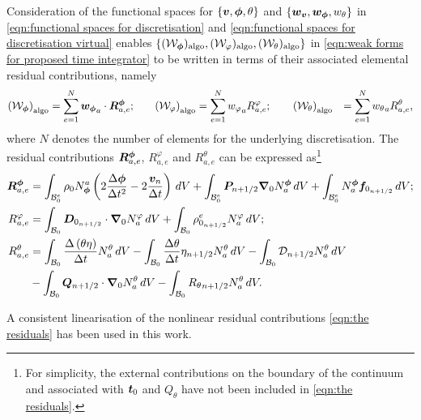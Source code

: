 Consideration of the functional spaces for $\{\boldsymbol{v},\boldsymbol{\phi},\theta\}$ and $\{\boldsymbol{w}_{\boldsymbol{v}},\boldsymbol{w}_{\boldsymbol{\phi}},w_{\theta}\}$ in \eqref{eqn:functional spaces for discretisation} and \eqref{eqn:functional spaces for discretisation virtual} enables  $\{(\mathcal{W}_{\boldsymbol{\phi}})_{\text{algo}},(\mathcal{W}_{{\varphi}})_{\text{algo}},(\mathcal{W}_{\theta})_{\text{algo}}\}$  in \eqref{eqn:weak forms for proposed time integrator} to be written in terms of their associated elemental residual contributions, namely
%
\begin{equation}
  \begin{aligned}	
    \left(\mathcal{W}_{\boldsymbol{\phi}}\right)_{\text{algo}} &= \sum_{e=1}^N{\boldsymbol{w}_{\boldsymbol{\phi}}}_a\cdot\boldsymbol{R}_{a,e}^{\boldsymbol{\phi}};&\quad
    \left(\mathcal{W}_{\varphi}\right)_{\text{algo}} &= \sum_{e=1}^N{w_{\varphi}}_a{R}_{a,e}^{\varphi};\qquad
    \left(\mathcal{W}_{\theta}\right)_{\text{algo}}& = \sum_{e=1}^N{w_{\theta}}_a{R}_{a,e}^{\theta},
  \end{aligned}
\end{equation}
%
where $N$ denotes the number of elements for the underlying discretisation. 
The residual contributions $\boldsymbol{R}^{\boldsymbol{\phi}}_{a,e}$, ${R}_{a,e}^{\varphi}$ and ${R}^{{\theta}}_{a,e}$ can be expressed as\footnote{For simplicity, the external contributions on the boundary of the continuum and associated with $\boldsymbol{t}_0$ and $Q_{\theta}$ have not been included in \eqref{eqn:the residuals}.}
%
\begin{equation}
  \label{eqn:the residuals}
  \begin{aligned}
    \boldsymbol{R}_{a,e}^{\boldsymbol{\phi}} &=
      \int_{\mathcal{B}^e_0}\rho_0N^a_{\boldsymbol{\phi}}\left(2\frac{\Delta\boldsymbol{\phi}}{\Delta t^2} - 2\frac{\boldsymbol{v}_n}{\Delta t}\right)\,dV +
      \int_{\mathcal{B}_0^e}\boldsymbol{P}_{n+1/2}\boldsymbol{\nabla}_0N^{\boldsymbol{\phi}}_a\,dV +
      \int_{\mathcal{B}_0^e}N^{\boldsymbol{\phi}}_{a}\boldsymbol{f}_{0_{n+1/2}}\,dV;\\
    R^{\varphi}_{a,e} &=
      \int_{\mathcal{B}_0}\boldsymbol{D}_{0_{n+1/2}}\cdot\boldsymbol{\nabla}_0N_a^{\varphi}\,dV +
      \int_{\mathcal{B}_0}\rho_{0_{n+1/2}}^eN_a^{\varphi}\,dV;\\
    R_{a,e}^{\theta} &=
      \int_{\mathcal{B}_0}\frac{\Delta\left(\theta\eta\right)}{\Delta t}N^{\theta}_a\,dV -
      \int_{\mathcal{B}_0}\frac{\Delta \theta}{\Delta t}\eta_{n+1/2}N^{\theta}_a\,dV -
      \int_{\mathcal{B}_0}\mathcal{D}_{n+1/2}N^{\theta}_a\,dV\\&-
      \int_{\mathcal{B}_0}\boldsymbol{Q}_{n+1/2}\cdot\boldsymbol{\nabla}_0N^{\theta}_a\,dV -
      \int_{\mathcal{B}_0}{R_{\theta}}_{n+1/2}N^{\theta}_a\,dV.
  \end{aligned}
\end{equation}
%

A consistent linearisation of the nonlinear residual contributions \eqref{eqn:the residuals} has been used in this work. 

